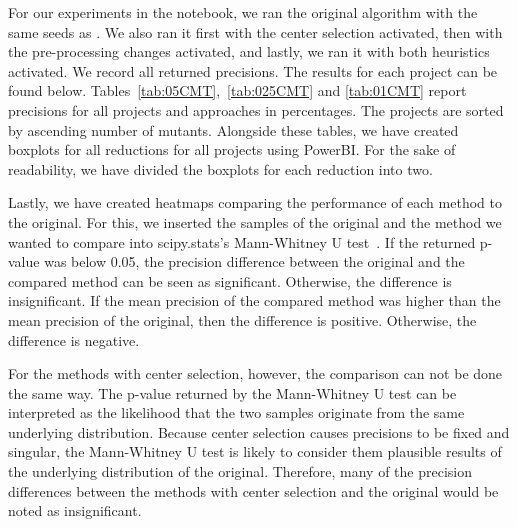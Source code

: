 \documentclass[twoside]{uva-inf-bachelor-thesis}
\begin{document}
For our experiments in the notebook, we ran the original algorithm with the same seeds as \textcite{Basarat21}. We also ran it first with the center selection activated, then with the pre-processing changes activated, and lastly, we ran it with both heuristics activated. We record all returned precisions. The results for each project can be found below. Tables~\ref{tab:05CMT},~\ref{tab:025CMT} and \ref{tab:01CMT} report precisions for all projects and approaches in percentages. The projects are sorted by ascending number of mutants. Alongside these tables, we have created boxplots for all reductions for all projects using PowerBI. For the sake of readability, we have divided the boxplots for each reduction into two.

Lastly, we have created heatmaps comparing the performance of each method to the original. For this, we inserted the samples of the original and the method we wanted to compare into scipy.stats's Mann-Whitney U test~\cite{mannWhitneyU}. If the returned p-value was below 0.05, the precision difference between the original and the compared method can be seen as significant. Otherwise, the difference is insignificant. If the mean precision of the compared method was higher than the mean precision of the original, then the difference is positive. Otherwise, the difference is negative.

For the methods with center selection, however, the comparison can not be done the same way. The p-value returned by the Mann-Whitney U test can be interpreted as the likelihood that the two samples originate from the same underlying distribution. Because center selection causes precisions to be fixed and singular, the Mann-Whitney U test is likely to consider them plausible results of the underlying distribution of the original. Therefore, many of the precision differences between the methods with center selection and the original would be noted as insignificant. 
\end{document}
